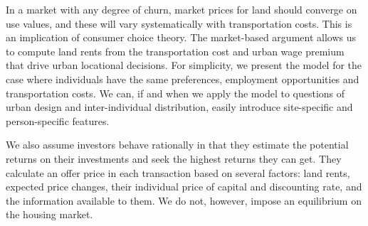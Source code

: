 




In a market with any degree of churn, market prices for land should converge on use values, and these will vary systematically with transportation costs. This is an implication of consumer choice theory. The market-based argument allows us to compute land rents from the transportation cost and urban wage premium that drive urban locational decisions. 
For simplicity, we present the model for the case where individuals have the same preferences, employment opportunities and transportation costs. We can, if and when we apply the model to questions of urban design and inter-individual distribution, easily introduce site-specific and person-specific features.  




We also assume investors behave rationally in that they estimate the potential returns on their investments and seek the highest returns they can get. They calculate an offer price in each transaction based on several factors: land rents, expected price changes, their individual price of capital and discounting rate, and the information available to them. We do not, however, impose an equilibrium on the housing market.


